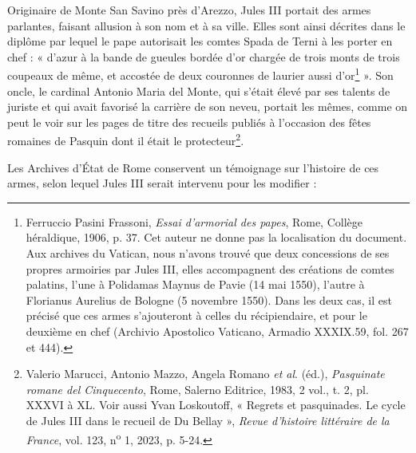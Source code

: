 \documentclass[12pt,twoside,openany]{book}
\begin{document}
Originaire de Monte San Savino près d’Arezzo, Jules III portait des armes parlantes, faisant allusion à son nom et à sa ville. Elles sont ainsi décrites dans le diplôme par lequel le pape autorisait les comtes Spada de Terni à les porter en chef : « d’azur à la bande de gueules bordée d’or chargée de trois monts de trois coupeaux de même, et accostée de deux couronnes de laurier aussi d’or\footnote{Ferruccio Pasini Frassoni, \textit{Essai d’armorial des papes}, Rome, Collège héraldique, 1906, p. 37. Cet auteur ne donne pas la localisation du document. Aux archives du Vatican, nous n’avons trouvé que deux concessions de ses propres armoiries par Jules III, elles accompagnent des créations de comtes palatins, l’une à Polidamas Maynus de Pavie (14 mai 1550), l’autre à Florianus Aurelius de Bologne (5 novembre 1550). Dans les deux cas, il est précisé que ces armes s’ajouteront à celles du récipiendaire, et pour le deuxième en chef (Archivio Apostolico Vaticano, Armadio XXXIX.59, fol. 267 et 444).} ». Son oncle, le cardinal Antonio Maria del Monte, qui s’était élevé par ses talents de juriste et qui avait favorisé la carrière de son neveu, portait les mêmes, comme on peut le voir sur les pages de titre des recueils publiés à l’occasion des fêtes romaines de Pasquin dont il était le protecteur\footnote{Valerio Marucci, Antonio Mazzo, Angela Romano \textit{et al}. (éd.), \textit{Pasquinate romane del Cinquecento}, Rome, Salerno Editrice, 1983, 2 vol., t. 2, pl. XXXVI à XL. Voir aussi Yvan Loskoutoff, « Regrets et pasquinades. Le cycle de Jules III dans le recueil de Du Bellay », \textit{Revue d’histoire littéraire de la France}, vol. 123, n\textsuperscript{o} 1, 2023, p. 5-24.}.

Les Archives d’État de Rome conservent un témoignage sur l’histoire de ces armes, selon lequel Jules III serait intervenu pour les modifier :
\end{document}
